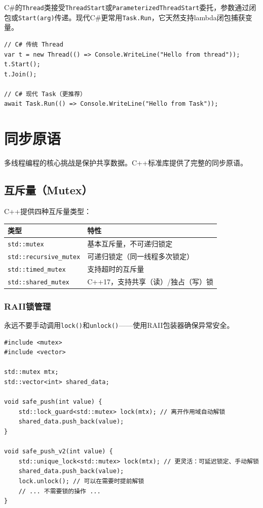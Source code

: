 \documentclass[12pt,a4paper,fontset=fandol]{ctexbook}
\newcommand{\cpp}[1]{C++#1}
\newcommand{\csharp}{C\#}
\begin{document}
\begin{compare}
\csharp{}的\texttt{Thread}类接受\texttt{ThreadStart}或\texttt{ParameterizedThreadStart}委托，参数通过闭包或\texttt{Start(arg)}传递。现代\csharp{}更常用\texttt{Task.Run}，它天然支持lambda闭包捕获变量。

\begin{lstlisting}[style=csharpstyle]
// C# 传统 Thread
var t = new Thread(() => Console.WriteLine("Hello from thread"));
t.Start();
t.Join();

// C# 现代 Task（更推荐）
await Task.Run(() => Console.WriteLine("Hello from Task"));
\end{lstlisting}
\end{compare}

\chapter{同步原语}

多线程编程的核心挑战是保护共享数据。\cpp{}标准库提供了完整的同步原语。

\section{互斥量（Mutex）}

\cpp{}提供四种互斥量类型：

\begin{longtable}{ll}
\toprule
\textbf{类型} & \textbf{特性} \\
\midrule
\texttt{std::mutex} & 基本互斥量，不可递归锁定 \\
\texttt{std::recursive\_mutex} & 可递归锁定（同一线程多次锁定） \\
\texttt{std::timed\_mutex} & 支持超时的互斥量 \\
\texttt{std::shared\_mutex} & \cpp{}17，支持共享（读）/独占（写）锁 \\
\bottomrule
\end{longtable}

\subsection{RAII锁管理}

永远不要手动调用\texttt{lock()}和\texttt{unlock()}——使用RAII包装器确保异常安全。

\begin{lstlisting}
#include <mutex>
#include <vector>

std::mutex mtx;
std::vector<int> shared_data;

void safe_push(int value) {
    std::lock_guard<std::mutex> lock(mtx); // 离开作用域自动解锁
    shared_data.push_back(value);
}

void safe_push_v2(int value) {
    std::unique_lock<std::mutex> lock(mtx); // 更灵活：可延迟锁定、手动解锁
    shared_data.push_back(value);
    lock.unlock(); // 可以在需要时提前解锁
    // ... 不需要锁的操作 ...
}
\end{lstlisting}
\end{document}
